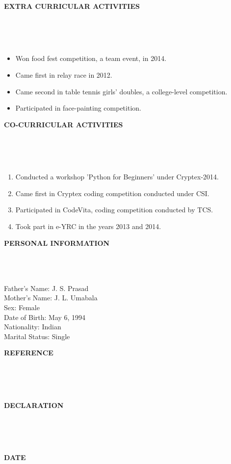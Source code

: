 \documentclass[a4paper,10pt]{article}
\newcommand{\lsep}{-0.5cm}
\newcommand{\resheading}[1]{{\small \colorbox{mygrey}{\begin{minipage}{0.975\textwidth}{\textbf{#1 \vphantom{p\^{E}}}}\end{minipage}}}}
\begin{document}
\resheading{\textbf{EXTRA CURRICULAR ACTIVITIES} }\\[\lsep]
\\ \\
\begin{itemize}
	\item Won food fest competition, a team event, in 2014.
	\item Came first in relay race in 2012.
	\item Came second in table tennis girls' doubles, a college-level competition.
	\item Participated in face-painting competition.
\end{itemize}


\resheading{\textbf{CO-CURRICULAR ACTIVITIES} }\\[\lsep]
\\ \\
\begin{enumerate}
	\item \noindent Conducted a workshop 'Python for Beginners' under Cryptex-2014.
	\item \noindent Came first in Cryptex coding competition conducted under CSI.
	\item \noindent Participated in CodeVita, coding competition conducted by TCS.
	\item \noindent Took part in e-YRC in the years 2013 and 2014.
	
\end{enumerate}

\resheading{\textbf{PERSONAL INFORMATION} }\\[\lsep]
\\ \\
\indent Father’s Name: J. S. Prasad \\
\indent Mother’s Name: J. L. Umabala \\
\indent Sex: Female \\
\indent Date of Birth: May 6, 1994 \\
\indent Nationality: Indian \\
\indent Marital Status: Single \\

\resheading{\textbf{REFERENCE} }\\[\lsep]
\\ \\

\resheading{\textbf{DECLARATION} }\\[\lsep]
\\ \\

\resheading{\textbf{DATE} }\\[\lsep]
\\ \\
\end{document}
